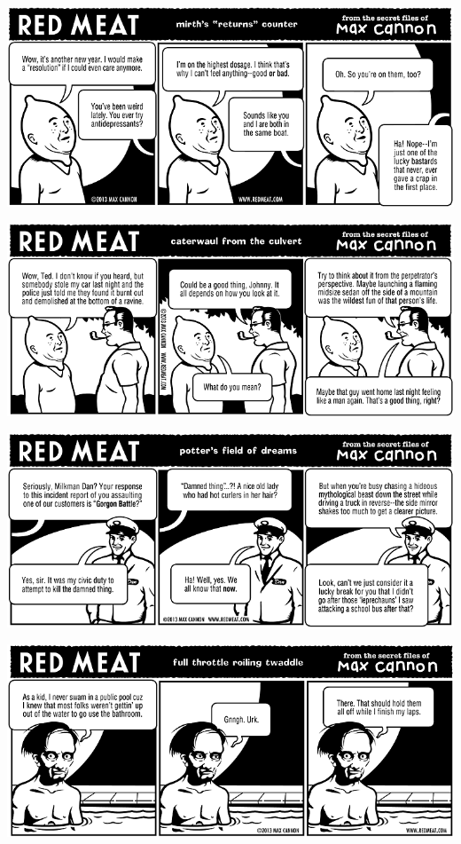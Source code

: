 \documentclass[a4paper,twoside,11pt]{article}
\begin{document}
\includegraphics[width=\textwidth]{redmeat_2013-01-08.png}



\includegraphics[width=\textwidth]{redmeat_2013-01-15.png}



\includegraphics[width=\textwidth]{redmeat_2013-01-22.png}



\includegraphics[width=\textwidth]{redmeat_2013-01-29.png}
\end{document}
